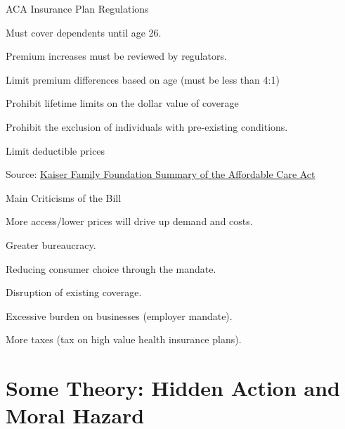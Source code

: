 \documentclass[aspectratio=169]{beamer}
\newenvironment{wideitemize}{\itemize\addtolength{\itemsep}{10pt}}{\enditemize}
\begin{document}
\begin{frame}{ACA Insurance Plan Regulations}
\begin{wideitemize}
    \item Must cover dependents until age 26.
    \item Premium increases must be reviewed by regulators.
    \item Limit premium differences based on age (must be less than 4:1)
    \item Prohibit lifetime limits on the dollar value of coverage
    \item Prohibit the exclusion of individuals with pre-existing conditions.
    \item Limit deductible prices
    
\end{wideitemize}

Source: \hyperlink{https://www.kff.org/health-reform/fact-sheet/summary-of-the-affordable-care-act/}{Kaiser Family Foundation Summary of the Affordable Care Act}

\end{frame}
\begin{frame}{Main Criticisms of the Bill}
    \begin{wideitemize}
        \item More access/lower prices will drive up demand and costs.
        \item Greater bureaucracy.
        \item Reducing consumer choice through the mandate.
        \item Disruption of existing coverage.
        \item Excessive burden on businesses (employer mandate).
        \item More taxes (tax on high value health insurance plans).
    \end{wideitemize}
\end{frame}




\section{Some Theory: Hidden Action and Moral Hazard}
\end{document}
